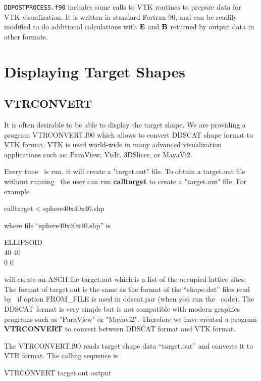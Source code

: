 {\tt DDPOSTPROCESS.f90} includes some calls to VTK routines to prepare data
for VTK visualization.  It is written in standard Fortran 90, and
can be readily modified to do additional calculations with ${\bf E}$ and
${\bf B}$ returned by  output data in other formats.
 
\section{Displaying Target Shapes}


\subsection{VTRCONVERT}

It is often desirable to be able to display the target shape. We are
providing a program VTRCONVERT.f90 which allows to convert DDSCAT
shape format to VTK format. VTK is used world-wide in many advanced
visualization applications such as: ParaView, VisIt, 3DSlicer, or
MayaVi2. 

Every time \ddscatseventhree\ is run, it will create a "target.out" file.
To obtain a target.out file without running \ddscatseventhree\, the
user can run {\bf calltarget} to create a "target.out" file.
For example

\indent\indent calltarget < sphere40x40x40.shp

\noindent where file {}``sphere40x40x40.shp'' is

\indent\indent ELLIPSOID \\
\indent{} 40 40 \\
\indent{} 0 0

\noindent will create an ASCII file \textquotedbl{}target.out\textquotedbl{}
which is a list of the occupied lattice sites. The format of \textquotedbl{}target.out\textquotedbl{}
is the same as the format of the {}``shape.dat'' files read by \ddscat\ 
if option
FROM\_FILE is used in ddscat.par (when you run the \ddscat\ code). The DDSCAT
format is very simple but is not compatible with 
modern graphics programs such as "ParaView" or
"Mayavi2".  Therefore we have created a program {\bf VTRCONVERT} to convert
between DDSCAT format and VTK format.

The VTRCONVERT.f90 reads target shape data 
\textquotedblleft{}target.out\textquotedblright{}
and converts it to VTR format. The calling sequence is 

\indent\indent VTRCONVERT target.out output

